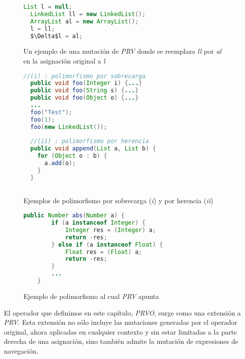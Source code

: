 \begin{figure}
	\centering
	\begin{lstlisting}[mathescape=true, language=Java, extendedchars=true,basicstyle={}]
  List l = null;
  LinkedList ll = new LinkedList();
  ArrayList al = new ArrayList();
  l = ll;
  $\Delta$l = al;
	\end{lstlisting}
	\caption[Ejemplo de mutaci\'on de \emph{PRV}]{Un ejemplo de una mutaci\'on de \emph{PRV} donde se reemplaza \emph{ll} por \emph{al} en la asignaci\'on original a \emph{l}}
	\label{figures.examples.PRV}
\end{figure}

\begin{figure}
	\centering
	\begin{lstlisting}[mathescape=true, language=Java, extendedchars=true,basicstyle={}]
  //(i) : polimorfismo por sobrecarga
  public void foo(Integer i) {...}
  public void foo(String s) {...}
  public void foo(Object o) {...}
  ...
  foo("Test");
  foo(1);
  foo(new LinkedList());
  
  //(ii) : polimorfismo por herencia
  public void append(List a, List b) {
    for (Object o : b) {
      a.add(o);
    }
  }
  
	\end{lstlisting}
	\caption[Ejemplos de polimorfismo]{Ejemplos de polimorfismo por sobrecarga (\emph{i}) y por herencia (\emph{ii})}
	\label{figures.examples.polimorfism}
\end{figure}

\begin{figure}
	\centering
	\begin{lstlisting}[mathescape=true, language=Java, extendedchars=true,tabsize=3,basicstyle={}]
	public Number abs(Number a) {
		if (a instanceof Integer) {
			Integer res = (Integer) a;
			return -res;
		} else if (a instanceof Float) {
			Float res = (Float) a;
			return -res;
		}
		...
	}
	\end{lstlisting}
	\caption{Ejemplo de polimorfismo al cual \emph{PRV} apunta}
	\label{figures.examples.polimorfismPRV}
\end{figure}

El operador que definimos en este cap\'itulo, \emph{PRVO}, surge como una extensi\'on a \emph{PRV}. Esta extensi\'on no s\'olo incluye las mutaciones generadas por el operador original, ahora aplicadas en cualquier contexto y sin estar limitadas a la parte derecha de una asignaci\'on, sino tambi\'en admite la mutaci\'on de expresiones de navegaci\'on.


